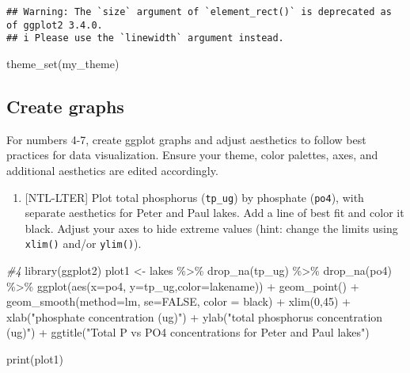 \documentclass[
]{article}
\newenvironment{Shaded}{\begin{snugshade}}{\end{snugshade}}
\newcommand{\AttributeTok}[1]{\textcolor[rgb]{0.77,0.63,0.00}{#1}}
\newcommand{\CommentTok}[1]{\textcolor[rgb]{0.56,0.35,0.01}{\textit{#1}}}
\newcommand{\ConstantTok}[1]{\textcolor[rgb]{0.00,0.00,0.00}{#1}}
\newcommand{\DecValTok}[1]{\textcolor[rgb]{0.00,0.00,0.81}{#1}}
\newcommand{\FunctionTok}[1]{\textcolor[rgb]{0.00,0.00,0.00}{#1}}
\newcommand{\NormalTok}[1]{#1}
\newcommand{\OtherTok}[1]{\textcolor[rgb]{0.56,0.35,0.01}{#1}}
\newcommand{\SpecialCharTok}[1]{\textcolor[rgb]{0.00,0.00,0.00}{#1}}
\newcommand{\StringTok}[1]{\textcolor[rgb]{0.31,0.60,0.02}{#1}}
\providecommand{\tightlist}{%
  \setlength{\itemsep}{0pt}\setlength{\parskip}{0pt}}
\begin{document}
\begin{verbatim}
## Warning: The `size` argument of `element_rect()` is deprecated as of ggplot2 3.4.0.
## i Please use the `linewidth` argument instead.
\end{verbatim}

\begin{Shaded}
\begin{Highlighting}[]
\FunctionTok{theme\_set}\NormalTok{(my\_theme)}
\end{Highlighting}
\end{Shaded}

\hypertarget{create-graphs}{%
\subsection{Create graphs}\label{create-graphs}}

For numbers 4-7, create ggplot graphs and adjust aesthetics to follow
best practices for data visualization. Ensure your theme, color
palettes, axes, and additional aesthetics are edited accordingly.

\begin{enumerate}
\def\labelenumi{\arabic{enumi}.}
\setcounter{enumi}{3}
\tightlist
\item
  {[}NTL-LTER{]} Plot total phosphorus (\texttt{tp\_ug}) by phosphate
  (\texttt{po4}), with separate aesthetics for Peter and Paul lakes. Add
  a line of best fit and color it black. Adjust your axes to hide
  extreme values (hint: change the limits using \texttt{xlim()} and/or
  \texttt{ylim()}).
\end{enumerate}

\begin{Shaded}
\begin{Highlighting}[]
\CommentTok{\#4 }
\FunctionTok{library}\NormalTok{(ggplot2)}
\NormalTok{plot1 }\OtherTok{\textless{}{-}}\NormalTok{ lakes }\SpecialCharTok{\%\textgreater{}\%}
  \FunctionTok{drop\_na}\NormalTok{(tp\_ug) }\SpecialCharTok{\%\textgreater{}\%}
  \FunctionTok{drop\_na}\NormalTok{(po4) }\SpecialCharTok{\%\textgreater{}\%}
  \FunctionTok{ggplot}\NormalTok{(}\FunctionTok{aes}\NormalTok{(}\AttributeTok{x=}\NormalTok{po4, }\AttributeTok{y=}\NormalTok{tp\_ug,}\AttributeTok{color=}\NormalTok{lakename)) }\SpecialCharTok{+} 
  \FunctionTok{geom\_point}\NormalTok{() }\SpecialCharTok{+}
  \FunctionTok{geom\_smooth}\NormalTok{(}\AttributeTok{method=}\StringTok{\textquotesingle{}lm\textquotesingle{}}\NormalTok{, }\AttributeTok{se=}\ConstantTok{FALSE}\NormalTok{, }\AttributeTok{color =} \StringTok{\textquotesingle{}black\textquotesingle{}}\NormalTok{) }\SpecialCharTok{+}
  \FunctionTok{xlim}\NormalTok{(}\DecValTok{0}\NormalTok{,}\DecValTok{45}\NormalTok{) }\SpecialCharTok{+}
  \FunctionTok{xlab}\NormalTok{(}\StringTok{"phosphate concentration (ug)"}\NormalTok{) }\SpecialCharTok{+}
  \FunctionTok{ylab}\NormalTok{(}\StringTok{"total phosphorus concentration (ug)"}\NormalTok{) }\SpecialCharTok{+}
  \FunctionTok{ggtitle}\NormalTok{(}\StringTok{"Total P vs PO4 concentrations for Peter and Paul lakes"}\NormalTok{)}

\FunctionTok{print}\NormalTok{(plot1)}
\end{Highlighting}
\end{Shaded}
\end{document}
